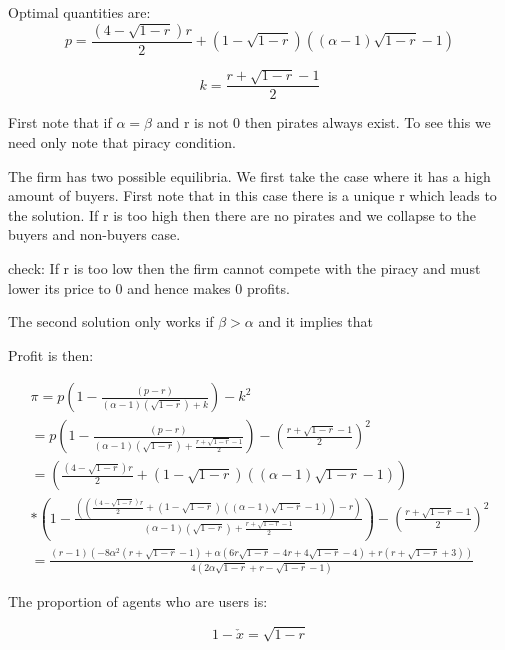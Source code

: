 \documentclass{article}
\begin{document}
Optimal quantities are: 
\begin{equation}
p = \frac{(4-\sqrt{1-r})r}{2}
+(1-\sqrt{1-r})((\alpha-1) \sqrt{1-r}-1) 
\end{equation}

\begin{equation}
k = \frac{r+\sqrt{1-r}-1}{2}
\end{equation}

First note that if $\alpha=\beta$ and r is not 0 then pirates always exist. To see this we need only note that piracy condition. 

The firm has two possible equilibria. We first take the case where it has a high amount of buyers. First note that in this case there is a unique r which leads to the solution. If r is too high then there are no pirates and we collapse to the buyers and non-buyers case. 

check: If r is too low then the firm cannot compete with the piracy and must lower its price to 0 and hence makes 0 profits. 

The second solution only works if $\beta>\alpha$ and it implies that 

Profit is then: 

\begin{align*}
\pi = p\left(1-\frac{ (p-r)}{(\alpha-1) 
\left( \sqrt{ 1-r } 
\right)+k} \right) -k^2 \\
= p\left(1-\frac{ (p-r)}{(\alpha-1) 
\left( \sqrt{ 1-r } 
\right)+\frac{r+\sqrt{1-r}-1}{2}} \right) -\left(\frac{r+\sqrt{1-r}-1}{2}\right)^2 \\
=\left(\frac{(4-\sqrt{1-r})r}{2}
+(1-\sqrt{1-r})((\alpha-1) \sqrt{1-r}-1) \right)
\\
*\left(1-\frac{ ((\frac{(4-\sqrt{1-r})r}{2}
+(1-\sqrt{1-r})((\alpha-1) \sqrt{1-r}-1) )-r)}{(\alpha-1) 
\left( \sqrt{ 1-r } 
\right)+\frac{r+\sqrt{1-r}-1}{2}} \right) -\left(\frac{r+\sqrt{1-r}-1}{2}\right)^2 \\
=\frac{(r-1) \left(-8 \alpha^2
   \left(r+\sqrt{1-r}-1\right)+\alpha
   \left(6 r\sqrt{1-r} -4 r+4
   \sqrt{1-r}-4\right)+r
   \left(r+\sqrt{1-r}+3\right)\right)}{
   4 \left(2 \alpha
   \sqrt{1-r}+r-\sqrt{1-r}-1\right)}
\end{align*}

The proportion of agents who are users is:

\begin{equation*}
1-\check{x}= \sqrt{1-r}
\end{equation*}
\end{document}
